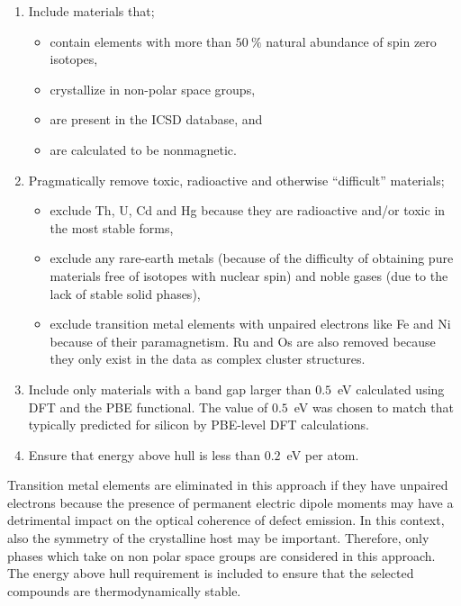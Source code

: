 \documentclass[superscriptaddress,unsortedaddress,
 amsmath,amssymb,
 aps,
]{revtex4-2}
\begin{document}
\begin{enumerate}
    \item Include materials that;
    \begin{itemize}
        \item contain elements with more than $50 \ \%$ natural abundance of spin zero isotopes,
        \item crystallize in non-polar space groups,
        \item are present in the ICSD database,  %
        and
        \item are calculated to be nonmagnetic. 
    \end{itemize}
    \item Pragmatically remove toxic, radioactive and otherwise ``difficult'' materials;
    \begin{itemize}
        \item exclude Th, U, Cd and Hg because they are radioactive and/or toxic in the most stable forms,
        \item exclude any rare-earth metals (because of the difficulty of obtaining pure materials free of isotopes with nuclear spin) and noble gases (due to the lack of stable solid phases),
        \item exclude transition metal elements with unpaired electrons like Fe and Ni because of their paramagnetism. Ru and Os are also removed because they only exist in the data as complex cluster structures. 
    \end{itemize}
    \item Include only materials with a band gap larger than $0.5$~eV calculated using DFT and the PBE functional. The value of $0.5$~eV was chosen to match that typically predicted for silicon by PBE-level DFT calculations. 
    \item Ensure that energy above hull is less than $0.2$~eV per atom.
\end{enumerate}

Transition metal elements are eliminated in this approach if they have unpaired electrons because the presence of permanent electric dipole moments may have a detrimental impact on the optical coherence of defect emission. In this context, also the symmetry of the crystalline host may be important. Therefore, only phases which take on non polar space groups are considered in this approach. 
The energy above hull requirement is included to ensure that the selected compounds are thermodynamically stable. 
\end{document}
